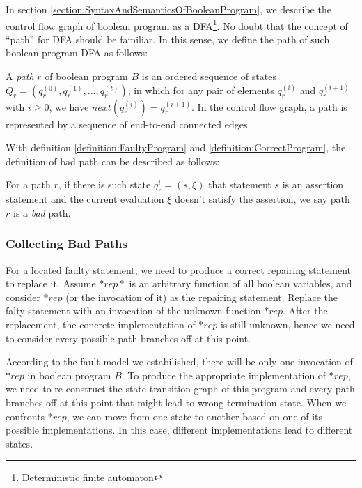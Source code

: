 In section \ref{section:SyntaxAndSemanticsOfBooleanProgram}, we describe the control flow graph of boolean program as a DFA\footnote{Deterministic finite automaton}. No doubt that the concept of ``path'' for DFA should be familiar. In this sense, we define the path of such boolean program DFA as follows:

\begin{definition}
A {\it path} $r$ of boolean program $B$ is an ordered sequence of states $Q_{r}=(q_{r}^{(0)},q_{r}^{(1)},\dots,q_{r}^{(t)})$, in which for any pair of elements $q_{r}^{(i)}$ and $q_{r}^{(i + 1)}$ with $i \ge 0$, we have $next(q_{r}^{(i)}) = q_{r}^{(i + 1)}$. In the control flow graph, a path is represented by a sequence of end-to-end connected edges.
\end{definition}

With definition \ref{definition:FaultyProgram} and \ref{definition:CorrectProgram}, the definition of bad path can be described as follows:

\begin{definition}
For a path $r$, if there is such state $q_r^{i} = (s,\xi)$ that statement $s$ is an assertion statement and the current evaluation $\xi$ doesn't satisfy the assertion, we say path $r$ is a {\it bad} path.
\end{definition}

\subsubsection{Collecting Bad Paths}
\label{section:CollectingBadRoutes}
For a located faulty statement, we need to produce a correct repairing statement to replace it.
Assume $*rep*$ is an arbitrary function of all boolean variables, and consider $*rep$ (or the invocation of it) as the repairing statement. Replace the falty statement with an invocation of the unknown function $*rep$.
After the replacement, the concrete implementation of $*rep$ is still unknown, hence we need to consider every possible path branches off at this point.

According to the fault model we estabilished, there will be only one invocation of $*rep$ in boolean program $B$. To produce the appropriate implementation of $*rep$, we need to re-construct the state transition graph of this program and every path branches off at this point that might lead to wrong termination state.
When we confronts $*rep$, we can move from one state to another based on one of its possible implementations. In this case, different implementations lead to different states.

